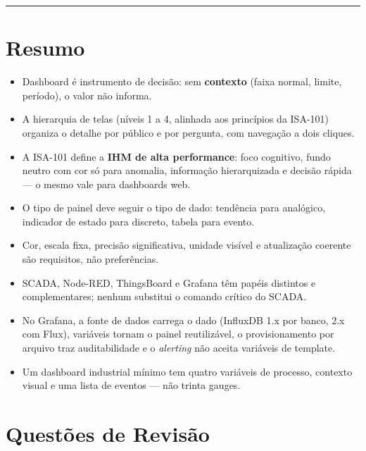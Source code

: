 \begin{center}\rule{0.5\linewidth}{0.5pt}\end{center}

\section{Resumo}\label{resumo}

\begin{itemize}
\tightlist
\item
  Dashboard é instrumento de decisão: sem \textbf{contexto} (faixa normal, limite, período), o valor não informa.
\item
  A hierarquia de telas (níveis 1 a 4, alinhada aos princípios da ISA-101) organiza o detalhe por público e por pergunta, com navegação a dois cliques.
\item
  A ISA-101 define a \textbf{IHM de alta performance}: foco cognitivo, fundo neutro com cor só para anomalia, informação hierarquizada e decisão rápida --- o mesmo vale para dashboards web.
\item
  O tipo de painel deve seguir o tipo de dado: tendência para analógico, indicador de estado para discreto, tabela para evento.
\item
  Cor, escala fixa, precisão significativa, unidade visível e atualização coerente são requisitos, não preferências.
\item
  SCADA, Node-RED, ThingsBoard e Grafana têm papéis distintos e complementares; nenhum substitui o comando crítico do SCADA.
\item
  No Grafana, a fonte de dados carrega o dado (InfluxDB 1.x por banco, 2.x com Flux), variáveis tornam o painel reutilizável, o provisionamento por arquivo traz auditabilidade e o \emph{alerting} não aceita variáveis de template.
\item
  Um dashboard industrial mínimo tem quatro variáveis de processo, contexto visual e uma lista de eventos --- não trinta gauges.
\end{itemize}

\section{Questões de Revisão}\label{questuxf5es-de-revisuxe3o}

